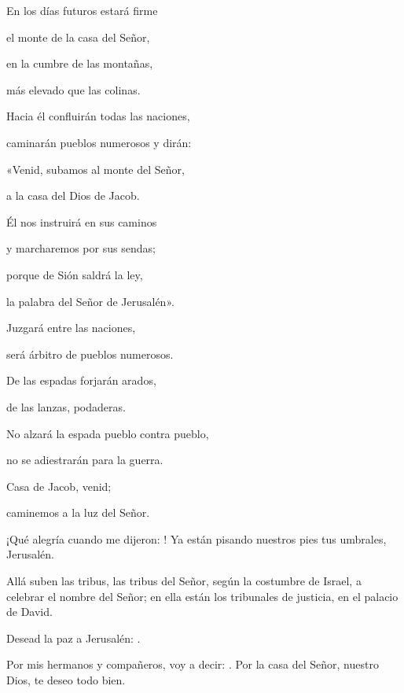\documentclass[]{article}
\begin{document}
\begin{readprose}
	En los días futuros estará firme

	el monte de la casa del Señor,

	en la cumbre de las montañas,

	más elevado que las colinas.

	Hacia él confluirán todas las naciones,

	caminarán pueblos numerosos y dirán:

	«Venid, subamos al monte del Señor,

	a la casa del Dios de Jacob.

	Él nos instruirá en sus caminos

	y marcharemos por sus sendas;

	porque de Sión saldrá la ley,

	la palabra del Señor de Jerusalén».

	Juzgará entre las naciones,

	será árbitro de pueblos numerosos.

	De las espadas forjarán arados,

	de las lanzas, podaderas.

	No alzará la espada pueblo contra pueblo,

	no se adiestrarán para la guerra.

	Casa de Jacob, venid;

	caminemos a la luz del Señor.
\end{readprose}


 


\begin{psbody}
	¡Qué alegría cuando me dijeron:
	!
	Ya están pisando nuestros pies
	tus umbrales, Jerusalén.

	Allá suben las tribus,
	las tribus del Señor,
	según la costumbre de Israel,
	a celebrar el nombre del Señor;
	en ella están los tribunales de justicia,
	en el palacio de David.

	Desead la paz a Jerusalén:
	.

	Por mis hermanos y compañeros,
	voy a decir: .
	Por la casa del Señor,
	nuestro Dios, te deseo todo bien.
\end{psbody}
\end{document}
